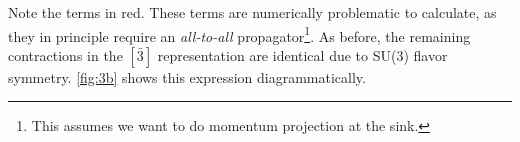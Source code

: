 \documentclass[11pt]{article}
\begin{document}
Note the terms in {\color{red}red}.  These terms are numerically problematic to calculate, as they in principle require an \emph{all-to-all} propagator\footnote{This assumes we want to do momentum projection at the sink.}.  As before, the remaining contractions in the $[\bar{3}]$ representation are identical due to SU(3) flavor symmetry. \autoref{fig:3b} shows this expression diagrammatically.
\end{document}
